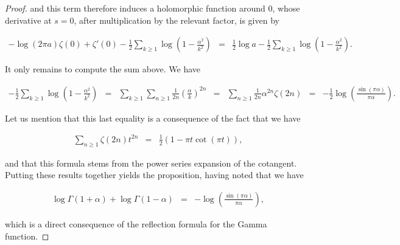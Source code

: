\documentclass{jams-l}
\theoremstyle{definition}
\theoremstyle{remark}
\numberwithin{equation}{section}
\begin{document}
\begin{proof}
                        \noindent and this term therefore induces a holomorphic function around $0$, whose derivative at $s=0$, after multiplication by the relevant factor, is given by
                        
                        \[ \begin{array}{lll}
                                \scriptstyle - \log \left( 2 \pi a \right) \zeta \left( 0 \right) + \zeta' \left( 0 \right) - \frac{1}{2} \sum\limits_{k \geqslant 1} \log \left( 1 - \frac{\alpha^2}{k^2} \right) & \scriptstyle = & \scriptstyle \frac{1}{2} \log a - \frac{1}{2} \sum\limits_{k \geqslant 1} \log \left( 1 - \frac{\alpha^2}{k^2} \right).
                            \end{array} \]
                        
                        \noindent It only remains to compute the sum above. We have
                        
                        \[ \begin{array}{lllllll}
                                \scriptstyle - \frac{1}{2} \sum\limits_{k \geqslant 1} \log \left( 1 - \frac{\alpha^2}{k^2} \right) & \scriptstyle = & \scriptstyle \sum\limits_{k \geqslant 1} \sum\limits_{n \geqslant 1} \frac{1}{2n} \left( \frac{\alpha}{k} \right)^{2n} & \scriptstyle = & \scriptstyle \sum\limits_{n \geqslant 1} \frac{1}{2n} \alpha^{2n} \zeta \left( 2n \right) & \scriptstyle = & \scriptstyle - \frac{1}{2} \log \left( \frac{\sin \left( \pi \alpha \right)}{\pi \alpha} \right).
                            \end{array} \]
                        
                        \noindent Let us mention that this last equality is a consequence of the fact that we have
                        
                        \[ \begin{array}{lll}
                                \sum\limits_{n \geqslant 1} \zeta \left( 2n \right) t^{2n} & = & \frac{1}{2} \left( 1 - \pi t \cot \left( \pi t \right) \right),
                            \end{array} \]
                        
                        \noindent and that this formula stems from the power series expansion of the cotangent. Putting these results together yields the proposition, having noted that we have
                        
                        \[ \begin{array}{lll}
                                \log \Gamma \left( 1+\alpha \right) + \log \Gamma \left( 1-\alpha \right) & = & - \log \left( \frac{\sin \left( \pi \alpha \right)}{\pi \alpha} \right),
                            \end{array} \]
                        
                        \noindent which is a direct consequence of the reflection formula for the Gamma function.
                        
                \end{proof}
                
\end{document}
